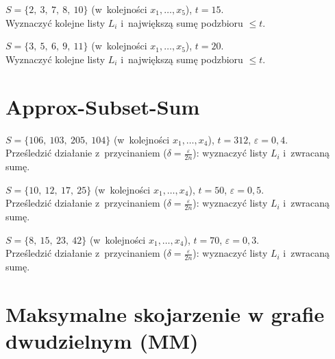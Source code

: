 \begin{example}
	$S = \{2,\ 3,\ 7,\ 8,\ 10\}$ (w~kolejności $x_1,\dots,x_5$), \quad $t = 15$.\\
	Wyznaczyć kolejne listy $L_i$ i~największą sumę podzbioru $\leq t$.
\end{example}

	\begin{example}
		$S = \{3,\ 5,\ 6,\ 9,\ 11\}$ (w~kolejności $x_1,\dots,x_5$), \quad $t = 20$.\\
		Wyznaczyć kolejne listy $L_i$ i~największą sumę podzbioru $\leq t$.
	\end{example}

\section{Approx-Subset-Sum}

\begin{example}
	$S = \{106,\ 103,\ 205,\ 104\}$ (w~kolejności $x_1,\dots,x_4$), \quad $t = 312$, \quad $\varepsilon = 0{,}4$.\\
	Prześledzić działanie z~przycinaniem ($\delta = \tfrac{\varepsilon}{2n}$): wyznaczyć listy $L_i$ i~zwracaną sumę.
\end{example}

\begin{example}
	$S = \{10,\ 12,\ 17,\ 25\}$ (w~kolejności $x_1,\dots,x_4$), \quad $t = 50$, \quad $\varepsilon = 0{,}5$.\\
	Prześledzić działanie z~przycinaniem ($\delta = \tfrac{\varepsilon}{2n}$): wyznaczyć listy $L_i$ i~zwracaną sumę.
\end{example}

	\begin{example}
		$S = \{8,\ 15,\ 23,\ 42\}$ (w~kolejności $x_1,\dots,x_4$), \quad $t = 70$, \quad $\varepsilon = 0{,}3$.\\
		Prześledzić działanie z~przycinaniem ($\delta = \tfrac{\varepsilon}{2n}$): wyznaczyć listy $L_i$ i~zwracaną sumę.
	\end{example}

\section{Maksymalne skojarzenie w grafie dwudzielnym (MM)}

